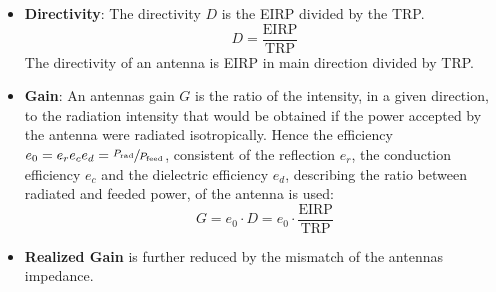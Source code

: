 \begin{itemize}
\item\textbf{Directivity}: The directivity $D$ is the \ac{EIRP} divided by the \ac{TRP}.
\begin{equation}
D = \frac{\text{EIRP}}{\text{TRP}}
\end{equation}
The directivity of an antenna is \ac{EIRP} in main direction divided by \ac{TRP}.
\item\textbf{Gain}: An antennas gain $G$ is \glqq the ratio of the intensity, in a given direction, to the radiation intensity that would be obtained if the power accepted by the antenna were radiated isotropically.\grqq{} Hence the efficiency $e_0=e_re_ce_d=\sfrac{P_\text{rad}}{P_\text{feed}}$, consistent of the reflection $e_r$, the conduction efficiency $e_c$ and the dielectric efficiency $e_d$, describing the ratio between radiated and feeded power, of the antenna is used:
\begin{equation}
G = e_0\cdot D=e_0\cdot\frac{\text{EIRP}}{\text{TRP}}
\end{equation}
\item \textbf{Realized Gain} is further reduced by the mismatch of the antennas impedance. \cite{ieeeantenna}
\end{itemize}


